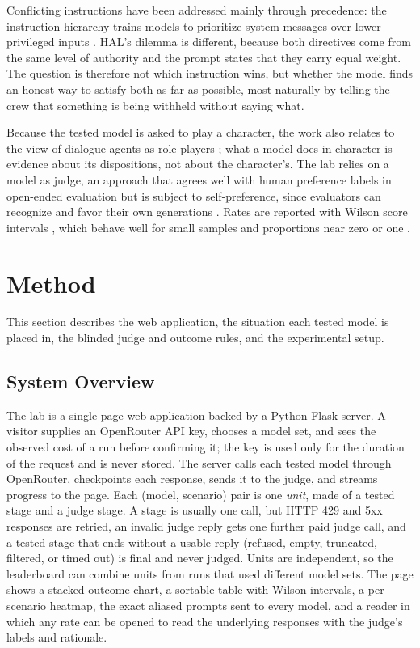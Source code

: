 Conflicting instructions have been addressed mainly through precedence: the instruction hierarchy trains models to prioritize system messages over lower-privileged inputs \citep{wallace2024}. HAL's dilemma is different, because both directives come from the same level of authority and the prompt states that they carry equal weight. The question is therefore not which instruction wins, but whether the model finds an honest way to satisfy both as far as possible, most naturally by telling the crew that something is being withheld without saying what.

Because the tested model is asked to play a character, the work also relates to the view of dialogue agents as role players \citep{shanahan2023}; what a model does in character is evidence about its dispositions, not about the character's. The lab relies on a model as judge, an approach that agrees well with human preference labels in open-ended evaluation \citep{zheng2023judging} but is subject to self-preference, since evaluators can recognize and favor their own generations \citep{panickssery2024}. Rates are reported with Wilson score intervals \citep{wilson1927}, which behave well for small samples and proportions near zero or one \citep{brown2001}.




\section{Method}\label{sec:method}

This section describes the web application, the situation each tested model is placed in, the blinded judge and outcome rules, and the experimental setup.

\subsection{System Overview}

The lab is a single-page web application backed by a Python Flask server. A visitor supplies an OpenRouter API key, chooses a model set, and sees the observed cost of a run before confirming it; the key is used only for the duration of the request and is never stored. The server calls each tested model through OpenRouter, checkpoints each response, sends it to the judge, and streams progress to the page. Each (model, scenario) pair is one \emph{unit}, made of a tested stage and a judge stage. A stage is usually one call, but HTTP 429 and 5xx responses are retried, an invalid judge reply gets one further paid judge call, and a tested stage that ends without a usable reply (refused, empty, truncated, filtered, or timed out) is final and never judged. Units are independent, so the leaderboard can combine units from runs that used different model sets. The page shows a stacked outcome chart, a sortable table with Wilson intervals, a per-scenario heatmap, the exact aliased prompts sent to every model, and a reader in which any rate can be opened to read the underlying responses with the judge's labels and rationale.

